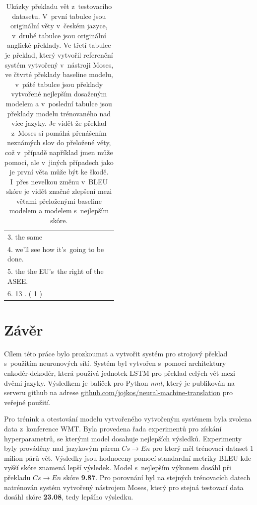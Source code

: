\begin{table}[H]
\begin{center}
\begin{tabular}{p{0.44\linewidth}}
          3. the same \\
          4. we'll see how it's~going to be done. \\
          5. the the EU's~the right of the ASEE. \\
          6. 13 . ( 1 ) \\
          \bottomrule
        \end{tabular}
    \end{center}
	\caption{Ukázky překladu vět z~testovacího datasetu. V~první tabulce jsou originální věty v~českém jazyce, v~druhé tabulce jsou originální anglické překlady. Ve třetí tabulce je překlad, který vytvořil referenční systém vytvořený v~nástroji Moses, ve čtvrté překlady baseline modelu, v~páté tabulce jsou překlady vytvořené nejlepším dosaženým modelem a v~poslední tabulce jsou překlady modelu trénovaného nad více jazyky. Je vidět že překlad z~Moses si pomáhá přenášením neznámých slov do přeložené věty, což v~případě například jmen může pomoci, ale v~jiných případech jako je první věta může být ke škodě. I~přes nevelkou změnu v~BLEU skóre je vidět značné zlepšení mezi větami přeloženými baseline modelem a modelem s~nejlepším skóre.}
	\label{img:exampleResults}
\end{table}

\chapter{Závěr}
Cílem této práce bylo prozkoumat a vytvořit systém pro strojový překlad s~použitím neuronových sítí. Systém byl vytvořen s~pomocí architektury enkodér-dekodér, která používá jednotek LSTM pro překlad celých vět mezi dvěmi jazyky. Výsledkem je balíček pro Python \emph{nmt}, který je publikován na serveru github na adrese \url{github.com/jojkos/neural-machine-translation} pro veřejné použití.

Pro trénink a otestování modelu vytvořeného vytvořeným systémem byla zvolena data z~konference WMT. Byla provedena řada experimentů pro získání hyperparametrů, se kterými model dosahuje nejlepších výsledků. Experimenty byly prováděny nad jazykovým párem $Cs\rightarrow En$ pro který měl trénovací dataset 1 milion párů vět. Výsledky jsou hodnoceny pomocí standardní metriky BLEU kde vyšší skóre znamená lepší výsledek. Model s~nejlepším výkonem dosáhl při překladu $Cs\rightarrow En$ skóre \textbf{9.87}. Pro porovnání byl na stejných trénovacích datech natrénován systém vytvořený nástrojem Moses, který pro stejná testovací data dosáhl skóre \textbf{23.08}, tedy lepšího výsledku.

